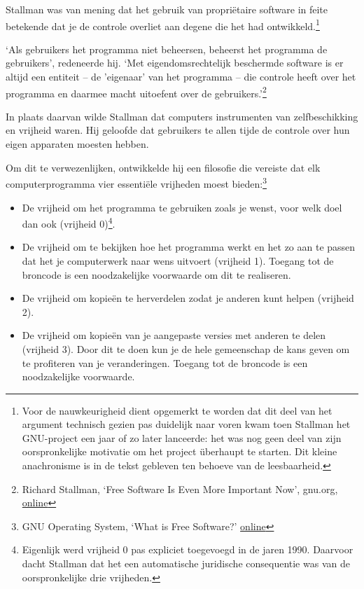 \documentclass[smalldemyvopaper,11pt,twoside,onecolumn,openright,extrafontsizes,hidelinks]{memoir}
\begin{document}
Stallman was van mening dat het gebruik van propriëtaire software in
feite betekende dat je de controle overliet aan degene die het had
ontwikkeld.\footnote{Voor de nauwkeurigheid dient opgemerkt te worden
  dat dit deel van het argument technisch gezien pas duidelijk naar
  voren kwam toen Stallman het GNU-project een jaar of zo later
  lanceerde: het was nog geen deel van zijn oorspronkelijke motivatie om
  het project überhaupt te starten. Dit kleine anachronisme is in de
  tekst gebleven ten behoeve van de leesbaarheid.}

`Als gebruikers het programma niet beheersen, beheerst het programma de
gebruikers', redeneerde hij. `Met eigendomsrechtelijk beschermde
software is er altijd een entiteit -- de 'eigenaar' van het programma --
die controle heeft over het programma en daarmee macht uitoefent over de
gebruikers.'\footnote{\hspace{0pt}Richard Stallman, `Free Software Is
  Even More Important Now', gnu.org,
  \href{https://www.gnu.org/philosophy/free-software-even-more-important.en.html}{online}}

In plaats daarvan wilde Stallman dat computers instrumenten van
zelfbeschikking en vrijheid waren. Hij geloofde dat gebruikers te allen
tijde de controle over hun eigen apparaten moesten hebben.

Om dit te verwezenlijken, ontwikkelde hij een filosofie die vereiste dat
elk computerprogramma vier essentiële vrijheden moest bieden:\footnote{\hspace{0pt}GNU
  Operating System, `What is Free Software?'
  \href{https://www.gnu.org/philosophy/free-sw.html}{online}}

\begin{itemize}
\item
  De vrijheid om het programma te gebruiken zoals je wenst, voor welk
  doel dan ook (vrijheid 0)\footnote{Eigenlijk werd vrijheid 0 pas
    expliciet toegevoegd in de jaren 1990. Daarvoor dacht Stallman dat
    het een automatische juridische consequentie was van de
    oorspronkelijke drie vrijheden.}.
\item
  De vrijheid om te bekijken hoe het programma werkt en het zo aan te
  passen dat het je computerwerk naar wens uitvoert (vrijheid 1).
  Toegang tot de broncode is een noodzakelijke voorwaarde om dit te
  realiseren.
\item
  De vrijheid om kopieën te herverdelen zodat je anderen kunt helpen
  (vrijheid 2).
\item
  De vrijheid om kopieën van je aangepaste versies met anderen te delen
  (vrijheid 3). Door dit te doen kun je de hele gemeenschap de kans
  geven om te profiteren van je veranderingen. Toegang tot de broncode
  is een noodzakelijke voorwaarde.
\end{itemize}
\end{document}
